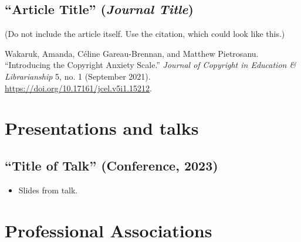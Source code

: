 \documentclass[12pt,oneside]{book}
\begin{document}
\subsection{``Article Title'' (\textit{Journal Title})}


(Do not include the article itself.  Use the citation, which could look like this.)


Wakaruk, Amanda, Céline Gareau-Brennan, and Matthew Pietrosanu. ``Introducing the Copyright Anxiety Scale.'' \textit{Journal of Copyright in Education \& Librarianship} 5, no. 1 (September 2021). \url{https://doi.org/10.17161/jcel.v5i1.15212}.

\vspace{\baselineskip}


\newpage

\section{Presentations and talks}

\subsection{``Title of Talk'' (Conference, 2023)}

\begin{itemize}
  \item Slides from talk.
\end{itemize}


\section{Professional Associations}
\end{document}
